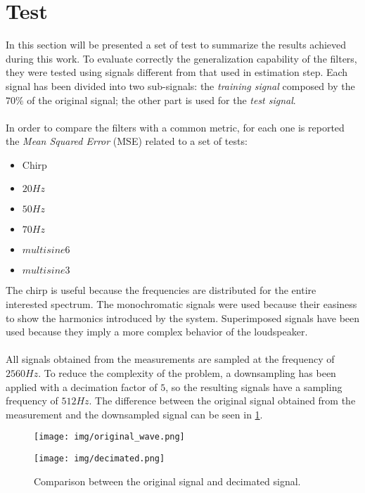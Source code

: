 \section{Test}
In this section will be presented a set of test to summarize the results achieved during this work. To evaluate correctly the generalization capability of the filters, 
they were tested using signals different from that used in estimation step. Each signal has been divided into two sub-signals: the \textit{training signal} composed by the $70\%$ of the original signal; the other part is used for the \textit{test signal}.\\\\
In order to compare the filters with a common metric, for each one is reported the \textit{Mean Squared Error} (MSE) related to a set of tests:
\begin{itemize}
\item Chirp
\item $20Hz$
\item $50Hz$
\item $70Hz$
\item $multisine6$
\item $multisine3$
\end{itemize}
The chirp is useful because the frequencies are distributed for the entire interested spectrum. The monochromatic signals were used because their easiness to show the harmonics introduced by the system. Superimposed signals have been used because they imply a more complex behavior of the loudspeaker.\\\\
All signals obtained from the measurements are sampled at the frequency of $2560Hz$. To reduce the complexity of the problem, a downsampling has been applied with a decimation factor of $5$, so the resulting signals have a sampling frequency of $512Hz$. The difference between the original signal obtained from the measurement and the downsampled signal can be seen in \ref{fig:comparison}.
\begin{figure}[H]
\caption{Comparison between the original signal and decimated signal.}\label{fig:comparison}
\begin{minipage}{.5\textwidth}
\centering
\texttt{[image: img/original\_wave.png]} 
\end{minipage}
\begin{minipage}{.5\textwidth}
\centering
\texttt{[image: img/decimated.png]} 
\end{minipage}
\end{figure}
